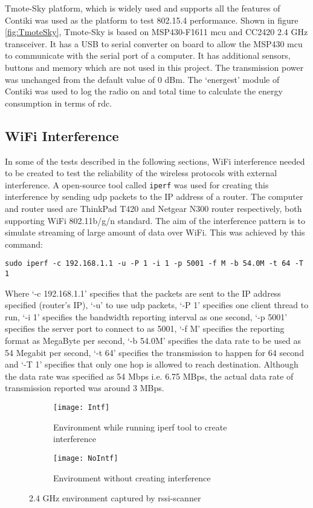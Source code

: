 Tmote-Sky platform, which is widely used and supports all the features of Contiki was used as the platform to test 802.15.4 performance. Shown in figure \ref{fig:TmoteSky}, Tmote-Sky is based on MSP430-F1611 \gls{mcu} and  CC2420 2.4 GHz transceiver. It has a USB to serial converter on board to allow the MSP430 \gls{mcu} to communicate with the serial port of a computer. It has additional sensors, buttons and memory which are not used in this project. The transmission power was unchanged from the default value of 0 dBm. The `energest' module of Contiki was used to log the radio on and total time to calculate the energy consumption in terms of \gls{rdc}. 

\subsection{WiFi Interference}
In some of the tests described in the following sections, WiFi interference needed to be created to test the reliability of the wireless protocols with external interference. A open-source tool called \texttt{iperf} was used for creating this interference by sending \gls{udp} packets to the IP address of a router. The computer and router used are ThinkPad T420 and Netgear N300 router respectively, both supporting WiFi 802.11b/g/n standard. The aim of the interference pattern is to simulate streaming of large amount of data over WiFi. This was achieved by this command:

\texttt{sudo iperf -c 192.168.1.1 -u -P 1 -i 1 -p 5001 -f M -b 54.0M -t 64 -T 1}

Where `-c 192.168.1.1' specifies that the packets are sent to the IP address specified (router's IP), `-u' to use \gls{udp} packets, `-P 1' specifies one client thread to run, `-i 1' specifies the bandwidth reporting interval as one second, `-p 5001' specifies the server port to connect to as 5001, `-f M' specifies the reporting format as MegaByte per second, `-b 54.0M' specifies the data rate to be used as 54 Megabit per second, `-t 64' specifies the transmission to happen for 64 second and `-T 1' specifies that only one hop is allowed to reach destination. Although the data rate was specified as 54 Mbps i.e. 6.75 MBps, the actual data rate of transmission reported was around 3 MBps. 

\begin{figure}[h]
	\begin{subfigure}[b]{1\textwidth}
		\texttt{[image: Intf]}
		\caption{Environment while running iperf tool to create interference}
		\vspace{10pt}
		\label{fig:Intf}
	\end{subfigure}

	\begin{subfigure}[b]{1\textwidth}
		\texttt{[image: NoIntf]}
		\caption{Environment without creating interference}
		\label{fig:NoIntf}
	\end{subfigure}
	\caption{2.4 GHz environment captured by rssi-scanner}
	\vspace{-10pt}
\end{figure}



